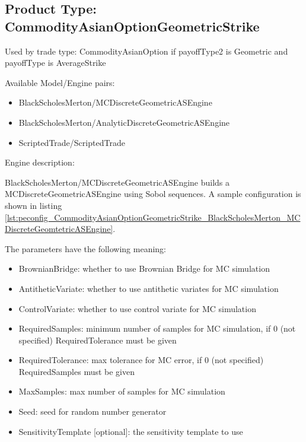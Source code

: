 \subsection{Product Type: CommodityAsianOptionGeometricStrike}

Used by trade type: CommodityAsianOption if payoffType2 is Geometric and payoffType is AverageStrike

Available Model/Engine pairs:

\begin{itemize}
  \item BlackScholesMerton/MCDiscreteGeometricASEngine
  \item BlackScholesMerton/AnalyticDiscreteGeometricASEngine
  \item ScriptedTrade/ScriptedTrade
\end{itemize}

Engine description:

BlackScholesMerton/MCDiscreteGeometricASEngine builds a MCDiscreteGeometricASEngine using Sobol sequences. A sample
configuration is shown in listing
\ref{lst:peconfig_CommodityAsianOptionGeometricStrike_BlackScholesMerton_MCDiscreteGeomtetricASEngine}.

The parameters have the following meaning:

\begin{itemize}
\item BrownianBridge: whether to use Brownian Bridge for MC simulation
\item AntitheticVariate: whether to use antithetic variates for MC simulation
\item ControlVariate: whether to use control variate for MC simulation
\item RequiredSamples: minimum number of samples for MC simulation, if 0 (not specified) RequiredTolerance must be given
\item RequiredTolerance: max tolerance for MC error, if 0 (not specified) RequiredSamples must be given
\item MaxSamples: max number of samples for MC simulation
\item Seed: seed for random number generator
\item SensitivityTemplate [optional]: the sensitivity template to use
\end{itemize}

